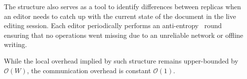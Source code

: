 


The structure also serves as a tool to identify differences between replicas
when an editor needs to catch up with the current state of the document in the
live editing session.  Each editor periodically performs an
anti-entropy~\cite{demers1987epidemic} round ensuring that no operations went
missing due to an unreliable network or offline writing.


While the local overhead implied by such structure remains upper-bounded by
$\mathcal{O}(W)$, the communication overhead is constant $\mathcal{O}(1)$.





